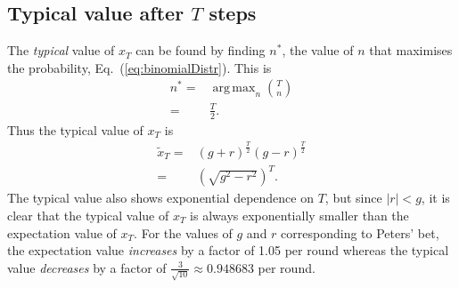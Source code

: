 \documentclass[11pt]{article}
\DeclareMathOperator*{\argmax}{arg\,max}
\begin{document}
\begin{multicols}{2}
\section{Typical value after $T$ steps}

The {\em typical} value of $x_T$ can be found by finding $n^*$,  the value of $n$ that maximises the probability, Eq.~(\ref{eq:binomialDistr}). This is
\begin{align*}
n^* =& \argmax_{n} {T \choose n}\\
=& \frac{T}{2}.
\end{align*}
Thus the typical value of $x_T$ is
\begin{align}
\nonumber \widetilde{x}_T =& (g+r)^\frac{T}{2} (g-r)^\frac{T}{2}\\
\label{eq:typicalxT} =& \left( \sqrt{g^2 - r^2}\right)^T.
\end{align}
The typical value also shows exponential dependence on $T$, but since $\left| r\right| < g$, it is clear that the typical value of $x_T$ is always exponentially smaller than the expectation value of $x_T$.
For the values of $g$ and $r$ corresponding to Peters' bet, the expectation value {\em increases} by a factor of 1.05 per round whereas the typical value {\em decreases} by a factor of $\frac{3}{\sqrt{10}} \approx 0.948683$ per round.


\end{multicols}
\end{document}
